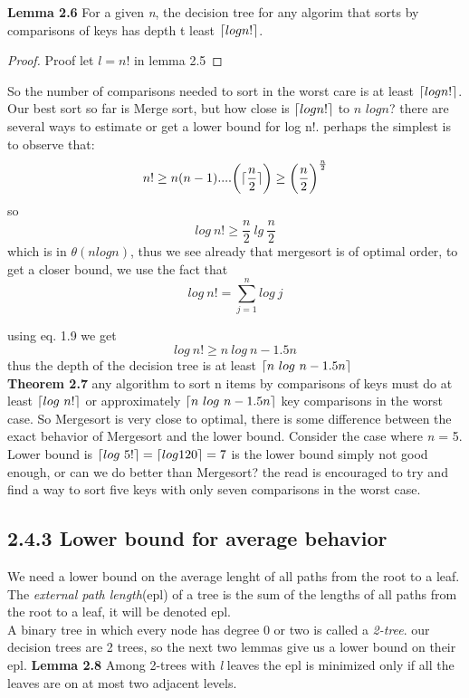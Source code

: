 \documentclass[a4paper,10pt,titlepage]{report}
\DeclarePairedDelimiter{\ceil}{\lceil}{\rceil}
\begin{document}
\vspace{5mm}
\textbf{Lemma 2.6} For a given \textit{n}, the decision tree for any algorim that sorts by comparisons of keys has depth t least $\ceil{log n!}$.
\vspace{5mm}
\begin{proof}
Proof let $\textit{l} = \textit{n}!$ in lemma 2.5
\end{proof}
\vspace{5mm}
So the number of comparisons needed to sort in the worst care is at least $\ceil{log n!}$. Our best sort so far is Merge sort, but how close is $\ceil{log n!}$ to $\textit{n }log\textit{n}$? there are several ways to estimate or get a lower bound for log n!. perhaps the simplest is to observe that:
\begin{equation}
n! \geq n(n-1)....\bigg(\ceil{\frac{n}{2}}\bigg) \geq \bigg(\frac{n}{2}\bigg)^{\frac{n}{2}}
\end{equation}
so
\begin{equation}
log \ n! \geq \frac{n}{2} \ lg \ \frac{n}{2}
\end{equation}
which is in $\theta(n log n)$, thus we see already that mergesort is of optimal order, to get a closer bound, we use the fact that 
\begin{equation}
log \ n! = \sum_{j=1}^n log \ j
\end{equation}

using eq. 1.9 we get
\begin{equation}
log \ n! \geq n \ log \ n - 1.5n
\end{equation}
thus the depth of the decision tree is at least $\ceil{n \ log \ n - 1.5n}$\\

\vspace{5mm}
\textbf{Theorem 2.7} any algorithm to sort n items by comparisons of keys must do at least $ \ceil{log \ n!}$ or approximately  $\ceil{n \ log \ n - 1.5n}$ key comparisons in the worst case.
\vspace{5mm}
So Mergesort is very close to optimal, there is some difference between the exact behavior of Mergesort and the lower bound. Consider the case where \textit{n} = 5. Lower bound is $\ceil{log \ 5!} = \ceil{log 120} = 7$ is the lower bound simply not good enough, or can we do better than Mergesort? the read is encouraged to try and find a way to sort five keys with only seven comparisons in the worst case.
\subsection{2.4.3 Lower bound for average behavior}
We need a lower bound on the average lenght of all paths from the root to a leaf. The \textit{external path length}(epl) of a tree is the sum of the lengths of all paths from the root to a leaf, it will be denoted epl. \\
A binary tree in which every node has degree 0 or two is called a \textit{2-tree}. our decision trees are 2 trees, so the next two lemmas give us a lower bound on their epl.
\vspace{5mm}
\textbf{Lemma 2.8} Among 2-trees with \textit{l} leaves the epl is minimized only if all the leaves are on at most two adjacent levels.
\end{document}
